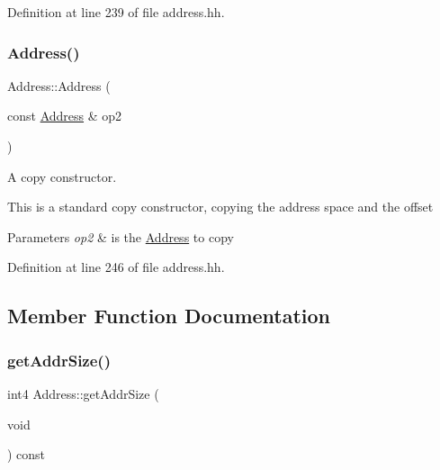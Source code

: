 Definition at line 239 of file address.\+hh.

\mbox{\label{class_address_a29436dab23400efc18afcf58ce529082}} 
\subsubsection{\texorpdfstring{Address()}{Address()}\hspace{0.1cm}{\footnotesize\ttfamily [4/4]}}
{\footnotesize\ttfamily Address\+::\+Address (\begin{DoxyParamCaption}\item[{const \mbox{\hyperlink{class_address}{Address}} \&}]{op2 }\end{DoxyParamCaption})\hspace{0.3cm}{\ttfamily [inline]}}



A copy constructor. 

This is a standard copy constructor, copying the address space and the offset 
\begin{DoxyParams}{Parameters}
{\em op2} & is the \mbox{\hyperlink{class_address}{Address}} to copy \\
\hline
\end{DoxyParams}


Definition at line 246 of file address.\+hh.



\subsection{Member Function Documentation}
\mbox{\label{class_address_a18dc61d8b617214f2ec054dabc3c9040}} 
\subsubsection{\texorpdfstring{getAddrSize()}{getAddrSize()}}
{\footnotesize\ttfamily int4 Address\+::get\+Addr\+Size (\begin{DoxyParamCaption}\item[{void}]{ }\end{DoxyParamCaption}) const\hspace{0.3cm}{\ttfamily [inline]}}



